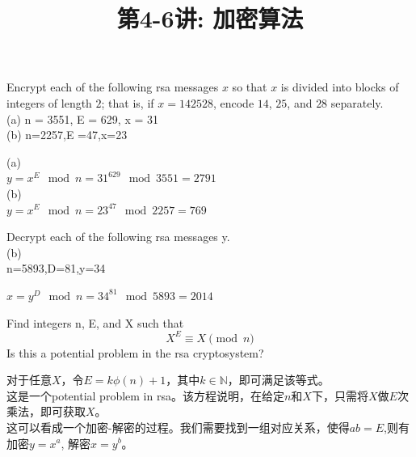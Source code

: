 \documentclass[a4paper, justified]{tufte-handout}
\title{第4-6讲: 加密算法}
\date{\zhtoday} %
\begin{document}
\maketitle
\noplagiarism %
\begin{abstract}
\end{abstract}
\beginrequired

\begin{problem}[TJ 7-7(a,b)]
Encrypt each of the following rsa messages $x$ so that $x$ is divided into blocks of integers of length $2$; that is, if $x = 142528$, encode $14$, $25$, and $28$ separately.\\
(a) n = 3551, E = 629, x = 31\\
(b) n=2257,E =47,x=23
\end{problem}

\begin{solution}
(a)\\
$y=x^{E}\mod n=31^{629}\mod 3551=2791$\\
(b)\\
$y = x^{E}\mod n=23^{47}\mod 2257=769$
\end{solution}

\begin{problem}[TJ 7-9(b)]
Decrypt each of the following rsa messages y.\\
(b)\\
n=5893,D=81,y=34
\end{problem}

\begin{solution}
$x =y^D\mod n = 34^{81}\mod 5893 = 2014$
\end{solution}

\begin{problem}[TJ 7-12]
Find integers n, E, and X such that
\[
X^{E}\equiv X \pmod n
\]
Is this a potential problem in the rsa cryptosystem?
\end{problem}

\begin{solution}
对于任意$X$，令$E=k\phi(n) + 1$，其中$k\in \mathbb{N}$，即可满足该等式。\\
这是一个potential problem in rsa。该方程说明，在给定$n$和$X$下，只需将$X$做$E$次乘法，即可获取$X$。\\
这可以看成一个加密-解密的过程。我们需要找到一组对应关系，使得$ab=E$,则有加密$y=x^{a}$, 解密$x=y^{b}$。
\end{solution}
\end{document}
